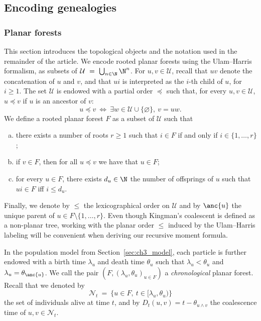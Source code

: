 \begin{refsegment}
\subsection{Encoding genealogies}\label{sec:marked_forests}

\subsubsection*{Planar forests}

This section introduces the topological objects and the notation used in the
remainder of the article. We encode rooted planar forests using the
Ulam--Harris formalism, \ie as subsets of $\mathcal{U}~=~
\bigcup_{n\in \N} \N^n$. For $u, v \in \mathcal{U}$, recall that $uv$
denote the concatenation of $u$ and $v$, and that $ui$ is interpreted as
the $i$-th child of $u$, for $i \geqslant 1$. The set $\mathcal{U}$ is endowed with
a partial order $\preccurlyeq$ such that, for every $u,v\in\mathcal{U}$,
$u\preccurlyeq v$ if $u$ is an ancestor of $v$:
\begin{equation*}
    u\preccurlyeq v\ \Longleftrightarrow \ \exists w\in 
    \mathcal{U} \cup \{ \varnothing \} ,\ v=uw.
\end{equation*}
We define a rooted planar forest $F$ as a subset of $\mathcal{U}$ such
that 
\begin{enumerate}[(a)]
    \item there exists a number of roots $r\geqslant 1$ such that $i\in F$ if
        and only if $i \in \{1,\ldots, r\}$;
    \item if $v\in F$, then for all $u\preccurlyeq v$ we have that $u\in F$;
    \item for every $u\in F$, there exists $d_u\in \N$ the number of offsprings of $u$ such that $ui\in F$ iff $i\leqslant d_u$.
\end{enumerate}
Finally, we denote by $\leqslant$ the lexicographical order on $\mathcal{U}$
and by $\anc{u}$ the unique parent of $u\in F \setminus \{1,\ldots, r\}$.
Even though Kingman's coalescent is defined as a non-planar tree, working
with the planar order $\leqslant$ induced by the Ulam--Harris labeling will be
convenient when deriving our recursive moment formula.

In the population model from Section~\ref{sec:ch3_model}, each particle is further
endowed with a birth time $\lambda_u$ and death time $\theta_u$ such
that $\lambda_u < \theta_u$ and $\lambda_u = \theta_{\anc{u}}$. We 
call the pair $(F, (\lambda_u, \theta_u)_{u \in F})$ a
\textit{chronological} planar forest. Recall that we denoted by 
\[
    \mathcal{N}_t\ =\ \big\{ u \in F,\ t \in [\lambda_u, \theta_u) \big\}
\]
the set of individuals alive at time $t$, and by $D_t(u, v) = t -
\theta_{u \wedge v}$ the coalescence time of $u, v \in \mathcal{N}_t$.



\end{refsegment}
